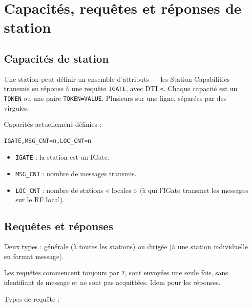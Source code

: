 \chapter[CAPACITÉS, REQUÊTES ET RÉPONSES DE STATION]{Capacités, requêtes et réponses de
station}\label{capacituxe9s-requuxeates-et-ruxe9ponses-de-station}

\section{Capacités de station}\label{capacituxe9s-de-station}

Une station peut définir un ensemble d'attributs --- les Station
Capabilities --- transmis en réponse à une requête \texttt{IGATE}, avec
DTI \texttt{\textless{}}. Chaque capacité est un \texttt{TOKEN} ou une
paire \texttt{TOKEN=VALUE}. Plusieurs sur une ligne, séparées par des
virgules.

Capacités actuellement définies :

\begin{verbatim}
IGATE,MSG_CNT=n,LOC_CNT=n
\end{verbatim}

\begin{itemize}
\tightlist
\item
  \texttt{IGATE} : la station est un IGate.
\item
  \texttt{MSG\_CNT} : nombre de messages transmis.
\item
  \texttt{LOC\_CNT} : nombre de stations « locales » (à qui l'IGate
  transmet les messages sur le RF local).
\end{itemize}

\section{Requêtes et réponses}\label{requuxeates-et-ruxe9ponses}

Deux types : générale (à toutes les stations) ou dirigée (à une station
individuelle en format message).

Les requêtes commencent toujours par \texttt{?}, sont envoyées une seule
fois, sans identifiant de message et ne sont pas acquittées. Idem pour
les réponses.

Types de requête :

